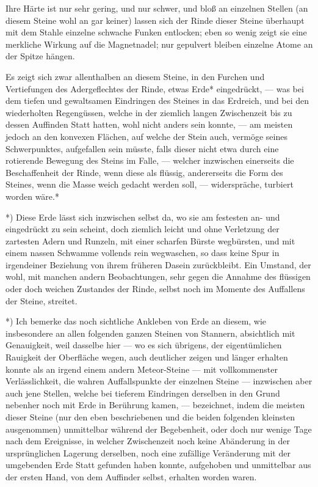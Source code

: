 \documentclass[a4paper, 11pt, oneside, german]{article}
\begin{document}
Ihre Härte ist nur sehr gering, und nur schwer, und bloß an einzelnen Stellen (an diesem Steine wohl an gar keiner) lassen sich der Rinde dieser Steine überhaupt mit dem Stahle einzelne schwache Funken entlocken; eben so wenig zeigt sie eine merkliche Wirkung auf die Magnetnadel; nur gepulvert bleiben einzelne Atome an der Spitze hängen.

Es zeigt sich zwar allenthalben an diesem Steine, in den Furchen und Vertiefungen des Adergeflechtes der Rinde, etwas Erde* eingedrückt, --- was bei dem tiefen und gewaltsamen Eindringen des Steines in das Erdreich, und bei den wiederholten Regengüssen, welche in der ziemlich langen Zwischenzeit bis zu dessen Auffinden Statt hatten, wohl nicht anders sein konnte, --- am meisten jedoch an den konvexen Flächen, auf welche der Stein auch, vermöge seines Schwerpunktes, aufgefallen sein müsste, falls dieser nicht etwa durch eine rotierende Bewegung des Steins im Falle, --- welcher inzwischen einerseits die Beschaffenheit der Rinde, wenn diese als flüssig, andererseits die Form des Steines, wenn die Masse weich gedacht werden soll, --- widerspräche, turbiert worden wäre.*

*) Diese Erde lässt sich inzwischen selbst da, wo sie am festesten an- und eingedrückt zu sein scheint, doch ziemlich leicht und ohne Verletzung der zartesten Adern und Runzeln, mit einer scharfen Bürste wegbürsten, und mit einem nassen Schwamme vollends rein wegwaschen, so dass keine Spur in irgendeiner Beziehung von ihrem früheren Dasein zurückbleibt. Ein Umstand, der wohl, mit manchen andern Beobachtungen, sehr gegen die Annahme des flüssigen oder doch weichen Zustandes der Rinde, selbst noch im Momente des Auffallens der Steine, streitet.

*) Ich bemerke das noch sichtliche Ankleben von Erde an diesem, wie insbesondere an allen folgenden ganzen Steinen von Stannern, absichtlich mit Genauigkeit, weil dasselbe hier --- wo es sich übrigens, der eigentümlichen Rauigkeit der Oberfläche wegen, auch deutlicher zeigen und länger erhalten konnte als an irgend einem andern Meteor-Steine --- mit vollkommenster Verlässlichkeit, die wahren Auffallspunkte der einzelnen Steine --- inzwischen aber auch jene Stellen, welche bei tieferem Eindringen derselben in den Grund nebenher noch mit Erde in Berührung kamen, --- bezeichnet, indem die meisten dieser Steine (nur den eben beschriebenen und die beiden folgenden kleinsten ausgenommen) unmittelbar während der Begebenheit, oder doch nur wenige Tage nach dem Ereignisse, in welcher Zwischenzeit noch keine Abänderung in der ursprünglichen Lagerung derselben, noch eine zufällige Veränderung mit der umgebenden Erde Statt gefunden haben konnte, aufgehoben und unmittelbar aus der ersten Hand, von dem Auffinder selbst, erhalten worden waren.
\end{document}
